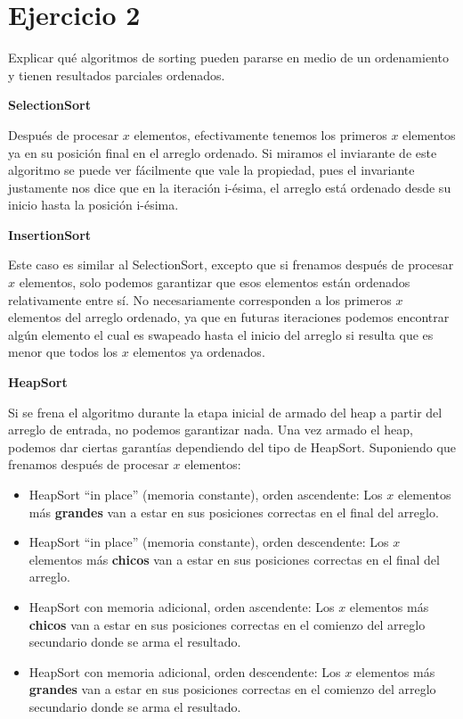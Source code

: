 \section{Ejercicio 2}

Explicar qué algoritmos de sorting pueden pararse en medio de un ordenamiento y tienen resultados parciales ordenados.

\textbf{SelectionSort}

Después de procesar $x$ elementos, efectivamente tenemos los primeros $x$ elementos ya en su posición final en el arreglo ordenado. Si miramos el inviarante de este algoritmo se puede ver fácilmente que vale la propiedad, pues el invariante justamente nos dice que en la iteración i-ésima, el arreglo está ordenado desde su inicio hasta la posición i-ésima.

\textbf{InsertionSort}

Este caso es similar al SelectionSort, excepto que si frenamos después de procesar $x$ elementos, solo podemos garantizar que esos elementos están ordenados relativamente entre sí. No necesariamente corresponden a los primeros $x$ elementos del arreglo ordenado, ya que en futuras iteraciones podemos encontrar algún elemento el cual es swapeado hasta el inicio del arreglo si resulta que es menor que todos los $x$ elementos ya ordenados.

\textbf{HeapSort}

Si se frena el algoritmo durante la etapa inicial de armado del heap a partir del arreglo de entrada, no podemos garantizar nada. Una vez armado el heap, podemos dar ciertas garantías dependiendo del tipo de HeapSort. Suponiendo que frenamos después de procesar $x$ elementos:

\begin{itemize}
    \item HeapSort ``in place'' (memoria constante), orden ascendente: Los $x$ elementos más \textbf{grandes} van a estar en sus posiciones correctas en el final del arreglo.
    \item HeapSort ``in place'' (memoria constante), orden descendente: Los $x$ elementos más \textbf{chicos} van a estar en sus posiciones correctas en el final del arreglo.
    \item HeapSort con memoria adicional, orden ascendente: Los $x$ elementos más \textbf{chicos} van a estar en sus posiciones correctas en el comienzo del arreglo secundario donde se arma el resultado.
    \item HeapSort con memoria adicional, orden descendente: Los $x$ elementos más \textbf{grandes} van a estar en sus posiciones correctas en el comienzo del arreglo secundario donde se arma el resultado.
\end{itemize}

